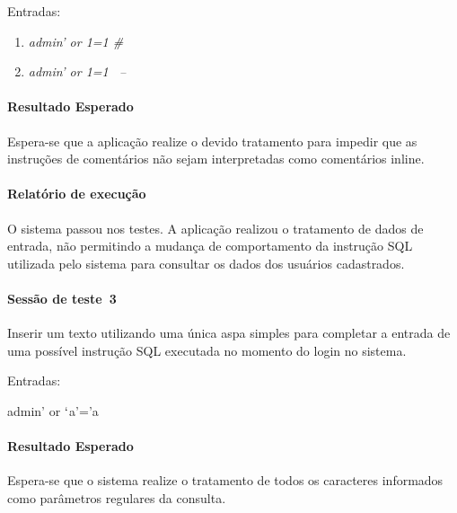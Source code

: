 \documentclass[
    12pt,               %
    openright,          %
    oneside,            %
    a4paper,            %
    section=TITLE,     %
    english,            %
    french,             %
    spanish,            %
    brazil              %
    ]{abntex2}
\begin{document}
Entradas:



\begin{enumerate}[start=1]
	
\item \emph{admin\rq{} or 1=1 \#~~ }
	
\item \emph{admin\rq{} or 1=1~ -- }

\end{enumerate}


\paragraph*{Resultado Esperado}

Espera-se que a aplicação realize o devido tratamento para impedir que as instruções de comentários não sejam interpretadas como comentários inline.



\paragraph*{Relatório de execução}

O sistema passou nos testes. A aplicação realizou o tratamento de dados de entrada, não permitindo a mudança de comportamento da instrução SQL utilizada pelo sistema para consultar os dados dos usuários cadastrados.





\paragraph*{Sessão de teste~3}

Inserir um texto utilizando uma única aspa simples para completar a entrada de uma possível instrução SQL executada no momento do login no sistema.


Entradas:


admin\rq{} or $\lq$a\rq{}=\rq{}a



\paragraph*{Resultado Esperado}

Espera-se que o sistema realize o tratamento de todos os caracteres informados como parâmetros regulares da consulta.
\end{document}
